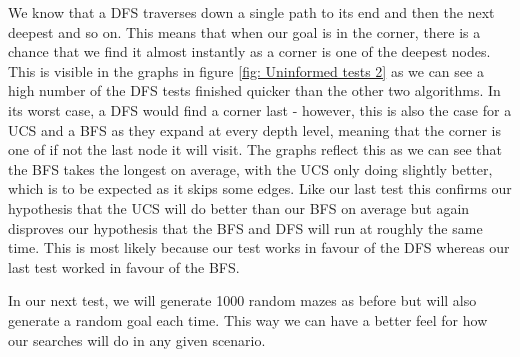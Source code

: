 \documentclass[]{final_report}
\begin{document}
We know that a DFS traverses down a single path to its end and then the next deepest and so on. This means that when our goal is in the corner, there is a chance that we find it almost instantly as a corner is one of the deepest nodes. This is visible in the graphs in figure \ref{fig: Uninformed tests 2} as we can see a high number of the DFS tests finished quicker than the other two algorithms. In its worst case, a DFS would find a corner last - however, this is also the case for a UCS and a BFS as they expand at every depth level, meaning that the corner is one of if not the last node it will visit. The graphs reflect this as we can see that the BFS takes the longest on average, with the UCS only doing slightly better, which is to be expected as it skips some edges. Like our last test this confirms our hypothesis that the UCS will do better than our BFS on average but again disproves our hypothesis that the BFS and DFS will run at roughly the same time. This is most likely because our test works in favour of the DFS whereas our last test worked in favour of the BFS.

In our next test, we will generate 1000 random mazes as before but will also generate a random goal each time. This way we can have a better feel for how our searches will do in any given scenario.
\newpage
\end{document}
